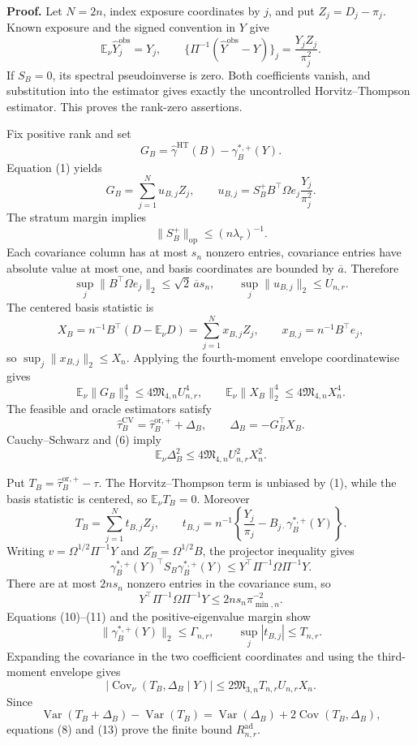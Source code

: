 \textbf{Proof.}
Let \(N=2n\), index exposure coordinates by \(j\), and put \(Z_j=D_j-\pi_j\).  Known exposure and the signed convention in \(Y\) give
\[
\mathbb E_\nu\widehat Y_j^{\mathrm{obs}}=Y_j,
\qquad
\{\Pi^{-1}(\widehat Y^{\mathrm{obs}}-Y)\}_j
=\frac{Y_jZ_j}{\pi_j^2}.
\tag{1}
\]
If \(S_B=0\), its spectral pseudoinverse is zero.  Both coefficients vanish, and substitution into the estimator gives exactly the uncontrolled Horvitz--Thompson estimator.  This proves the rank-zero assertions.

Fix positive rank and set
\[
G_B=\widehat\gamma^{\mathrm{HT}}(B)-\gamma_B^{*,+}(Y).
\]
Equation (1) yields
\[
G_B=\sum_{j=1}^{N}u_{B,j}Z_j,
\qquad
u_{B,j}=S_B^+B^{\top}\Omega e_j\frac{Y_j}{\pi_j^2}.
\tag{2}
\]
The stratum margin implies
\[
\lVert S_B^+\rVert_{\mathrm{op}}\le(n\lambda_r)^{-1}.
\tag{3}
\]
Each covariance column has at most \(s_n\) nonzero entries, covariance entries have absolute value at most one, and basis coordinates are bounded by \(\overline a\).  Therefore
\[
\sup_j\lVert B^{\top}\Omega e_j\rVert_2
\le\sqrt2\,\overline a s_n,
\qquad
\sup_j\lVert u_{B,j}\rVert_2\le U_{n,r}.
\tag{4}
\]
The centered basis statistic is
\[
X_B=n^{-1}B^{\top}(D-\mathbb E_\nu D)
=\sum_{j=1}^{N}x_{B,j}Z_j,
\qquad
x_{B,j}=n^{-1}B^{\top}e_j,
\tag{5}
\]
so \(\sup_j\lVert x_{B,j}\rVert_2\le X_n\).  Applying the fourth-moment envelope coordinatewise gives
\[
\mathbb E_\nu\lVert G_B\rVert_2^4
\le4\mathfrak M_{4,n}U_{n,r}^4,
\qquad
\mathbb E_\nu\lVert X_B\rVert_2^4
\le4\mathfrak M_{4,n}X_n^4.
\tag{6}
\]
The feasible and oracle estimators satisfy
\[
\widehat\tau_B^{\mathrm{CV}}
=\widehat\tau_B^{\mathrm{or},+}+\Delta_B,
\qquad
\Delta_B=-G_B^{\top}X_B.
\tag{7}
\]
Cauchy--Schwarz and (6) imply
\[
\mathbb E_\nu\Delta_B^2
\le4\mathfrak M_{4,n}U_{n,r}^2X_n^2.
\tag{8}
\]

Put \(T_B=\widehat\tau_B^{\mathrm{or},+}-\tau\).  The Horvitz--Thompson term is unbiased by (1), while the basis statistic is centered, so \(\mathbb E_\nu T_B=0\).  Moreover
\[
T_B=\sum_{j=1}^{N}t_{B,j}Z_j,
\qquad
t_{B,j}=n^{-1}\left\{\frac{Y_j}{\pi_j}
-B_{j\cdot}\gamma_B^{*,+}(Y)\right\}.
\tag{9}
\]
Writing \(v=\Omega^{1/2}\Pi^{-1}Y\) and \(Z_B^\circ=\Omega^{1/2}B\), the projector inequality gives
\[
\gamma_B^{*,+}(Y)^{\top}S_B\gamma_B^{*,+}(Y)
\le Y^{\top}\Pi^{-1}\Omega\Pi^{-1}Y.
\tag{10}
\]
There are at most \(2ns_n\) nonzero entries in the covariance sum, so
\[
Y^{\top}\Pi^{-1}\Omega\Pi^{-1}Y
\le2ns_n\pi_{\min,n}^{-2}.
\tag{11}
\]
Equations (10)--(11) and the positive-eigenvalue margin show
\[
\lVert\gamma_B^{*,+}(Y)\rVert_2\le\Gamma_{n,r},
\qquad
\sup_j|t_{B,j}|\le T_{n,r}.
\tag{12}
\]
Expanding the covariance in the two coefficient coordinates and using the third-moment envelope gives
\[
|\operatorname{Cov}_\nu(T_B,\Delta_B\mid Y)|
\le2\mathfrak M_{3,n}T_{n,r}U_{n,r}X_n.
\tag{13}
\]
Since
\[
\operatorname{Var}(T_B+\Delta_B)-\operatorname{Var}(T_B)
=\operatorname{Var}(\Delta_B)+2\operatorname{Cov}(T_B,\Delta_B),
\]
equations (8) and (13) prove the finite bound \(R_{n,r}^{\mathrm{ad}}\).

